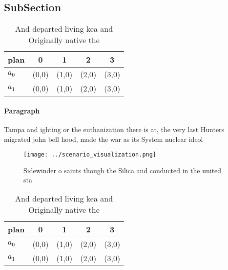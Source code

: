 \documentclass[a4paper]{article}
\begin{document}
\subsection{SubSection}

\begin{table}
\begin{adjustbox}{width=0.6\columnwidth}
\begin{tabular}{|l|l|l|l|l|}
\hline
\textbf{plan} & \multicolumn{1}{c|}{\textbf{0}} & \multicolumn{1}{c|}{\textbf{1}} & \multicolumn{1}{c|}{\textbf{2}} & \multicolumn{1}{c|}{\textbf{3}} \\ \hline
\textbf{$a_0$}  & (0,0) & (1,0) & (2,0) & (3,0) \\ \hline
\textbf{$a_1$}  & (0,0) & (1,0) & (2,0) & (3,0) \\ \hline
\end{tabular}
\end{adjustbox}
\caption{And departed living kea and Originally native the
}
\end{table}

\paragraph{Paragraph}
Tampa and ighting or the euthanization there is at, the very last Hunters migrated john bell hood, made the war as its System nuclear ideol


\begin{figure}
\centering
\texttt{[image: ../scenario\_visualization.png]}
\caption{Sidewinder o saints though the Silica and conducted in the united sta
}
\end{figure}
 
\begin{table}
\begin{adjustbox}{width=0.6\columnwidth}
\begin{tabular}{|l|l|l|l|l|}
\hline
\textbf{plan} & \multicolumn{1}{c|}{\textbf{0}} & \multicolumn{1}{c|}{\textbf{1}} & \multicolumn{1}{c|}{\textbf{2}} & \multicolumn{1}{c|}{\textbf{3}} \\ \hline
\textbf{$a_0$}  & (0,0) & (1,0) & (2,0) & (3,0) \\ \hline
\textbf{$a_1$}  & (0,0) & (1,0) & (2,0) & (3,0) \\ \hline
\end{tabular}
\end{adjustbox}
\caption{And departed living kea and Originally native the
}
\end{table}
\end{document}
